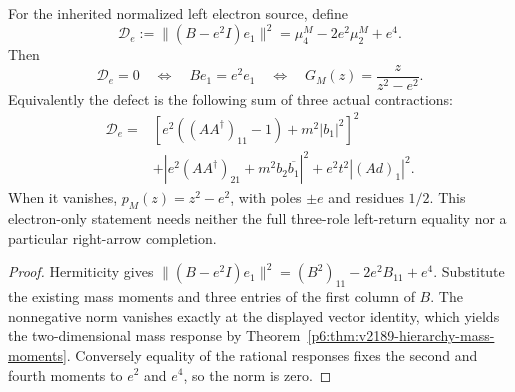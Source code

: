 \documentclass[12pt,a4paper]{article}
\begin{document}
\begin{corollary}
\label{p6:cor:v2191-electron-defect}
For the inherited normalized left electron source, define
\[
 \mathcal D_e:=\|(B-e^2I)e_1\|^2
       =\mu_4^M-2e^2\mu_2^M+e^4.
\]
Then
\[
 \boxed{\mathcal D_e=0\quad\Longleftrightarrow\quad
   Be_1=e^2e_1\quad\Longleftrightarrow\quad
   G_M(z)=\frac{z}{z^2-e^2}.}
\]
Equivalently the defect is the following sum of three actual contractions:
\[
 \boxed{\begin{aligned}
 \mathcal D_e={}&
  [e^2((AA^\dagger)_{11}-1)+m^2|b_1|^2]^2\\
 &+|e^2(AA^\dagger)_{21}+m^2b_2\overline{b_1}|^2
   +e^2t^2|(Ad)_1|^2.
 \end{aligned}}
\]
When it vanishes, $p_M(z)=z^2-e^2$, with poles $\pm e$ and residues
$1/2$. This electron-only statement needs neither the full three-role
left-return equality nor a particular right-arrow completion.
\end{corollary}
\begin{proof}
Hermiticity gives
$\|(B-e^2I)e_1\|^2=(B^2)_{11}-2e^2B_{11}+e^4$.
Substitute the existing mass moments and three entries of the first column
of $B$. The nonnegative norm vanishes exactly at the displayed vector
identity, which yields the two-dimensional mass response by
Theorem~\ref{p6:thm:v2189-hierarchy-mass-moments}.
Conversely equality of the rational responses fixes the second and fourth
moments to $e^2$ and $e^4$, so the norm is zero.
\end{proof}
\end{document}
